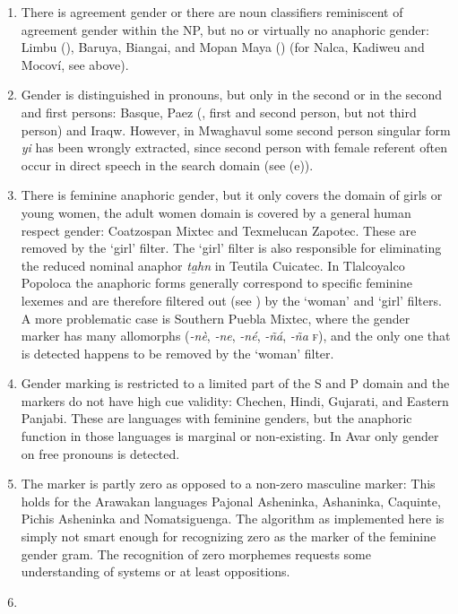 \documentclass[output=collectionpaper]{langsci/langscibook}
\begin{document}
\begin{enumerate}[label=(\alph*)]
\item
There is agreement gender or there are noun classifiers reminiscent of agreement gender within the NP, but no or virtually no anaphoric gender: Limbu (\citealt[21]{Driem1987}), Baruya, Biangai, and Mopan Maya (\citealt{Contini-Morava2018}) (for Nalca, Kadiweu and Mocoví, see  above).
\item
Gender is distinguished in pronouns, but only in the second or in the second and first persons: Basque, Paez (\citealt[136]{Jung2008}, first and second person, but not third person) and Iraqw. However, in Mwaghavul some second person singular form \textit{yi} has been wrongly extracted, since second person with female referent often occur in direct speech in the search domain (see  (e)).
\item
There is feminine anaphoric gender, but it only covers the domain of girls or young women, the adult women domain is covered by a general human respect gender: Coatzospan Mixtec and Texmelucan Zapotec. These are removed by the ‘girl’ filter. The ‘girl’ filter is also responsible for eliminating the reduced nominal anaphor \textit{ta̱hn} in Teutila Cuicatec. In Tlalcoyalco Popoloca the anaphoric forms generally correspond to specific feminine lexemes and are therefore filtered out (see ) by the ‘woman’ and ‘girl’ filters. A more problematic case is Southern Puebla Mixtec, where the gender marker has many allomorphs (\textit{-nè}, \textit{-ne},  \textit{-né}, \textit{-ñá}, \textit{-ña} \textsc{f}), and the only one that is detected happens to be removed by the ‘woman’ filter.
\item
Gender marking is restricted to a limited part of the S and P domain and the markers do not have high cue validity: Chechen, Hindi, Gujarati, and Eastern Panjabi. These are languages with feminine genders, but the anaphoric function in those languages is marginal or non-existing. In Avar only gender on free pronouns is detected.
\item
The marker is partly zero as opposed to a non-zero masculine marker: This holds for the Arawakan languages Pajonal Asheninka, Ashaninka, Caquinte, Pichis Asheninka and Nomatsiguenga. The algorithm as implemented here is simply not smart enough for recognizing zero as the marker of the feminine gender gram. The recognition of zero morphemes requests some understanding of systems or at least oppositions.
\item

\end{enumerate}
\end{document}
